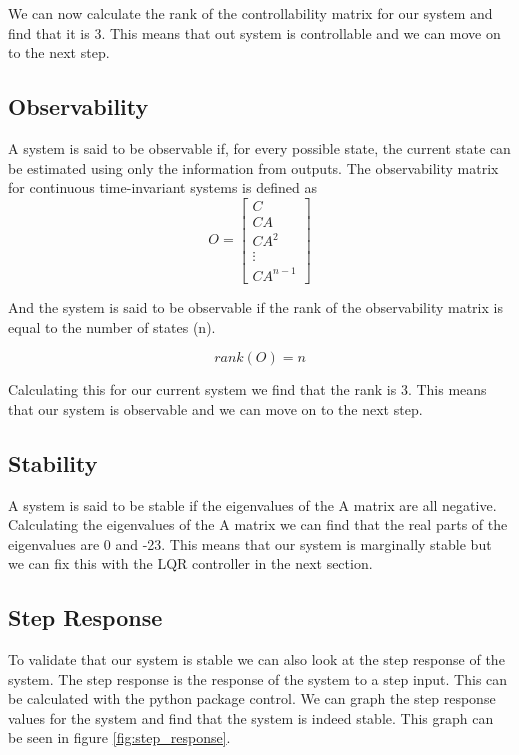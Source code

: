 \documentclass{scrartcl}
\begin{document}
We can now calculate the rank of the controllability matrix for our system and find that it is 3. This means that out system is controllable and we can move on to the next step.

\subsection{Observability}
A system is said to be observable if, for every possible state, the current state can be estimated using only the information from outputs.
The observability matrix for continuous time-invariant systems is defined as
\begin{equation}
    \mathit{O} = \begin{bmatrix}
        C      \\
        CA     \\
        CA^2   \\
        \vdots \\
        CA^{n-1}
    \end{bmatrix}
\end{equation}

And the system is said to be observable if the rank of the observability matrix is equal to the number of states (n).

\begin{equation}
    \mathit{rank}(\mathit{O}) = n
\end{equation}

Calculating this for our current system we find that the rank is 3. This means that our system is observable and we can move on to the next step.

\subsection{Stability}
A system is said to be stable if the eigenvalues of the A matrix are all negative.
Calculating the eigenvalues of the A matrix we can find that the real parts of the eigenvalues are 0 and -23. This means that our system is marginally stable but we can fix this with the LQR controller in the next section.

\subsection{Step Response}
To validate that our system is stable we can also look at the step response of the system.
The step response is the response of the system to a step input.
This can be calculated with the python package control.
We can graph the step response values for the system and find that the system is indeed stable. This graph can be seen in figure \ref{fig:step_response}.
\end{document}

